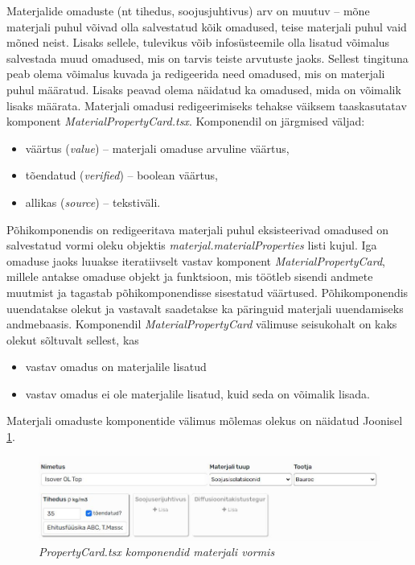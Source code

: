 Materjalide omaduste (nt tihedus, soojusjuhtivus) arv on muutuv -- mõne materjali puhul võivad olla salvestatud
kõik omadused, teise materjali puhul vaid mõned neist. Lisaks sellele, tulevikus võib infosüsteemile olla lisatud
võimalus salvestada muud omadused, mis on tarvis teiste arvutuste jaoks. Sellest tingituna peab olema võimalus kuvada
ja redigeerida need omadused, mis on materjali puhul määratud. Lisaks peavad olema näidatud ka omadused,
mida on võimalik lisaks määrata. Materjali omadusi redigeerimiseks tehakse väiksem taaskasutatav 
komponent \textit{MaterialPropertyCard.tsx}. Komponendil on järgmised väljad:
\begin{itemize}
    \item väärtus (\textit{value}) -- materjali omaduse arvuline väärtus,
    \item tõendatud (\textit{verified}) -- boolean väärtus,
    \item allikas (\textit{source}) -- tekstiväli.
\end{itemize}

Põhikomponendis on redigeeritava materjali puhul eksisteerivad omadused on salvestatud vormi oleku objektis \textit{materjal.materialProperties}
listi kujul. Iga omaduse jaoks luuakse iteratiivselt vastav komponent \textit{MaterialPropertyCard}, millele antakse omaduse objekt ja funktsioon, 
mis töötleb sisendi andmete muutmist ja tagastab põhikomponendisse sisestatud väärtused. Põhikomponendis uuendatakse olekut ja vastavalt
saadetakse ka päringuid materjali uuendamiseks andmebaasis. Komponendil \textit{MaterialPropertyCard} välimuse seisukohalt on kaks olekut sõltuvalt 
sellest, kas 
\begin{itemize}
    \item vastav omadus on materjalile lisatud
    \item vastav omadus ei ole materjalile lisatud, kuid seda on võimalik lisada.  
\end{itemize}

Materjali omaduste komponentide välimus mõlemas olekus on näidatud Joonisel \ref{fig:development_frontend_propertycard}.
 \begin{figure}[ht]
    \centering
    \includegraphics[width=1\textwidth]{figures/development/frontend_propertycard.JPG}
    \caption[\textit{PropertyCard} materjali omaduste komponendid materjali vormis]{\textit{PropertyCard.tsx komponendid materjali vormis}}
    \label{fig:development_frontend_propertycard}
\end{figure}

